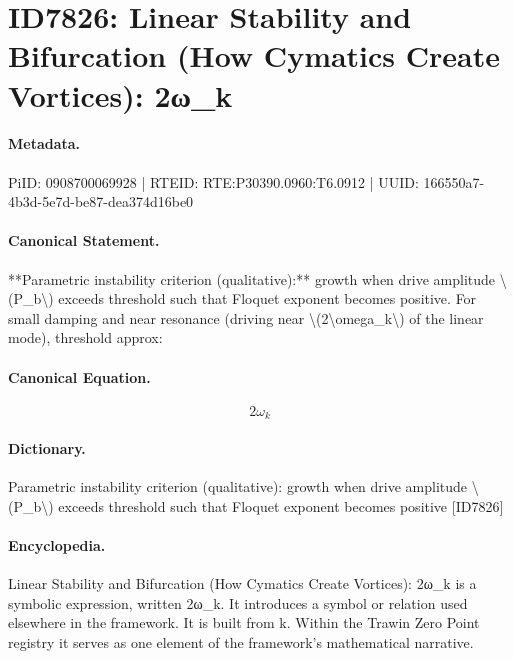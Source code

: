 \section*{ID7826: Linear Stability and Bifurcation (How Cymatics Create Vortices): 2ω\_k}
\paragraph{Metadata.}
PiID: 0908700069928 | RTEID: RTE:P30390.0960:T6.0912 | UUID: 166550a7-4b3d-5e7d-be87-dea374d16be0

\paragraph{Canonical Statement.}
**Parametric instability criterion (qualitative):** growth when drive amplitude \textbackslash{}(P\_b\textbackslash{}) exceeds threshold such that Floquet exponent becomes positive. For small damping and near resonance (driving near \textbackslash{}(2\textbackslash{}omega\_k\textbackslash{}) of the linear mode), threshold approx:

\paragraph{Canonical Equation.}
\[
2\omega_k
\]

\paragraph{Dictionary.}
Parametric instability criterion (qualitative): growth when drive amplitude \textbackslash{}(P\_b\textbackslash{}) exceeds threshold such that Floquet exponent becomes positive [ID7826]

\paragraph{Encyclopedia.}
Linear Stability and Bifurcation (How Cymatics Create Vortices): 2ω\_k is a symbolic expression, written 2ω\_k. It introduces a symbol or relation used elsewhere in the framework. It is built from k. Within the Trawin Zero Point registry it serves as one element of the framework's mathematical narrative.
